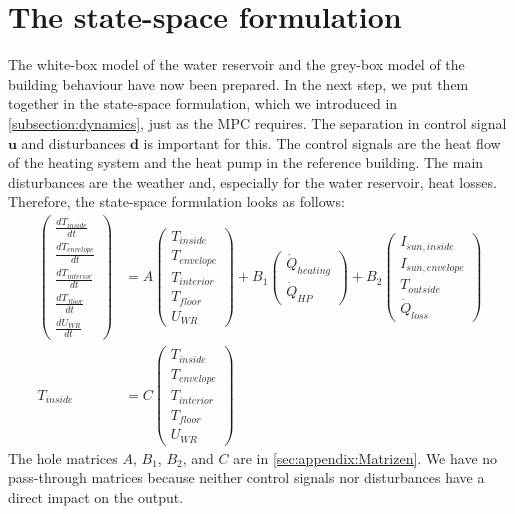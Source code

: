     \section{The state-space formulation}
    \label{holeModel}
    The white-box model of the water reservoir and the grey-box model of the building behaviour have now been prepared. In the next step, we put them together in the state-space formulation, which we introduced in \autoref{subsection:dynamics}, just as the MPC requires.\newline
    The separation in control signal $\textbf{u}$ and disturbances $\textbf{d}$ is important for this. The control signals are the heat flow of the heating system and the heat pump in the reference building. The main disturbances are the weather and, especially for the water reservoir, heat losses. Therefore, the state-space formulation looks as follows: 
  \begin{align}
	    \label{eq:ZRD Modell}
	 \left(\begin{array}{c} \frac{d T_{inside}}{d t} \\ \frac{d T_{envelope}}{d t} \\ \frac{d T_{interior}}{d t}\\ \frac{d T_{floor}}{d t}\\ \frac{d U_{WR}}{d t} \end{array}\right) &= A \left(\begin{array}{c} T_{inside} \\ T_{envelope} \\ T_{interior}\\ T_{floor}\\ U_{WR} \end{array}\right) + B_\text{1} \left(\begin{array}{c} \dot{Q}_{heating} \\ \dot{Q}_{HP} \end{array}\right) + B_\text{2} \left(\begin{array}{c} I_{sun,inside}\\ I_{sun,envelope}\\ T_{outside} \\ \dot{Q}_{loss} \end{array}\right) \\
	 T_{inside} &= C \left(\begin{array}{c} T_{inside} \\ T_{envelope} \\ T_{interior}\\ T_{floor}\\ U_{WR} \end{array}\right) \nonumber
	\end{align}	
    The hole matrices $A$, $B_\text{1}$, $B_\text{2}$, and $C$ are in \autoref{sec:appendix:Matrizen}. We have no pass-through matrices because neither control signals nor disturbances have a direct impact on the output. 